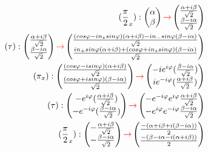 \documentclass{article}
\begin{document}
\begin{equation}\label{eq29}\begin{aligned}
(\frac{\pi}{2}_x):\begin{pmatrix}\alpha \\\beta  \end{pmatrix}\textcolor{red}{\rightarrow}\begin{pmatrix}\frac{\alpha+i\beta}{\sqrt{2}} \\ \frac{\beta-i\alpha}{\sqrt{2}} \end{pmatrix}\\
(\tau):\begin{pmatrix}\frac{\alpha+i\beta}{\sqrt{2}}\\ \frac{\beta-i\alpha}{\sqrt{2}} \end{pmatrix}\textcolor{red}{\rightarrow}\begin{pmatrix}\frac{(cos\varphi-in_zsin\varphi)(\alpha+i\beta)-in_-sin\varphi(\beta-i\alpha)}{\sqrt{2}}\\\frac{in_+sin\varphi(\alpha+i\beta)+(cos\varphi+in_zsin\varphi)(\beta-i\alpha)}{\sqrt{2}} \end{pmatrix}\\
(\pi_x):\begin{pmatrix}\frac{(cos\varphi-isin\varphi)(\alpha+i\beta)}{\sqrt{2}}\\\frac{(cos\varphi+isin\varphi)(\beta-i\alpha)}{\sqrt{2}} \end{pmatrix}\textcolor{red}{\rightarrow}\begin{pmatrix}-ie^{i\varphi}(\frac{\beta-i\alpha}{\sqrt{2}})\\ie^{-i\varphi}(\frac{\alpha+i\beta}{\sqrt{2}}) \end{pmatrix}\\
(\tau):\begin{pmatrix}-e^{i\varphi}(\frac{\alpha+i\beta}{\sqrt{2}})\\ -e^{-i\varphi}(\frac{\beta-i\alpha}{\sqrt{2}}) \end{pmatrix}\textcolor{red}{\rightarrow}\begin{pmatrix} -e^{-i\varphi}e^{i\varphi}\frac{\alpha+i\beta}{\sqrt{2}}\\ -e^{i\varphi}e^{-i\varphi}\frac{\beta-i\alpha}{\sqrt{2}} \end{pmatrix}\\
(\frac{\pi}{2}_x):\begin{pmatrix}-\frac{\alpha+i\beta}{\sqrt{2}}\\-\frac{\beta-i\alpha}{\sqrt{2}} \end{pmatrix}\textcolor{red}{\rightarrow}\begin{pmatrix}\frac{-(\alpha+i\beta+i(\beta-i\alpha))}{2} \\ \frac{-(\beta-i\alpha-i(\alpha+i\beta))}{2} \end{pmatrix}
\end{aligned}\end{equation}
\end{document}
